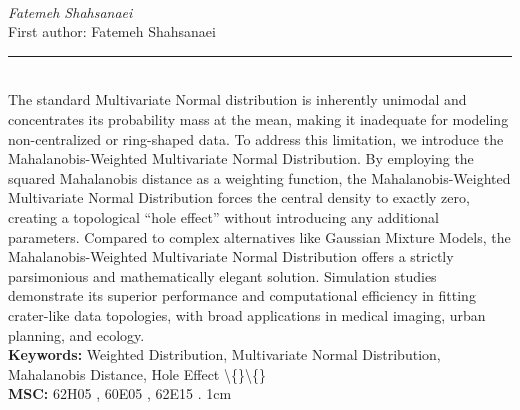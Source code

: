 \documentclass[10pt,twoside]{article}
\begin{document}
\noindent\begin{minipage}[t][\textheight]{\textwidth}
\\[0.35em]
{\itshape Fatemeh Shahsanaei}\\[0.2em]
{\footnotesize First author: Fatemeh Shahsanaei}\\[0.45em]
\noindent\rule{\textwidth}{0.3pt}\\[0.4em]
{\footnotesize  The standard Multivariate Normal distribution is inherently unimodal and concentrates its probability mass at the mean, making it inadequate for modeling non-centralized or ring-shaped data. To address this limitation, we introduce the Mahalanobis-Weighted Multivariate Normal Distribution. By employing the squared Mahalanobis distance as a weighting function, the Mahalanobis-Weighted Multivariate Normal Distribution forces the central density to exactly zero, creating a topological ``hole effect'' without introducing any additional parameters. Compared to complex alternatives like Gaussian Mixture Models, the Mahalanobis-Weighted Multivariate Normal Distribution offers a strictly parsimonious and mathematically elegant solution. Simulation studies demonstrate its superior performance and computational efficiency in fitting crater-like data topologies, with broad applications in medical imaging, urban planning, and ecology.}\\[0.4em]
{\footnotesize\bfseries Keywords:} {\footnotesize Weighted Distribution, Multivariate Normal Distribution, Mahalanobis Distance, Hole Effect \textbackslash\{\}\textbackslash\{\}}\\[0.15em]
{\footnotesize\bfseries MSC:} {\footnotesize 62H05 , 60E05 , 62E15 . 1cm}\\
\vfill
\end{minipage}
\newpage
\end{document}
